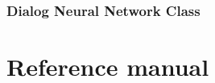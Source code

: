 \documentclass[11pt,fleqn,,a4paper,twoside,openright]{book}
\begin{document}
\subsection*{Dialog Neural Network Class}


\newpage

\chapter{Reference manual}

\end{document}

